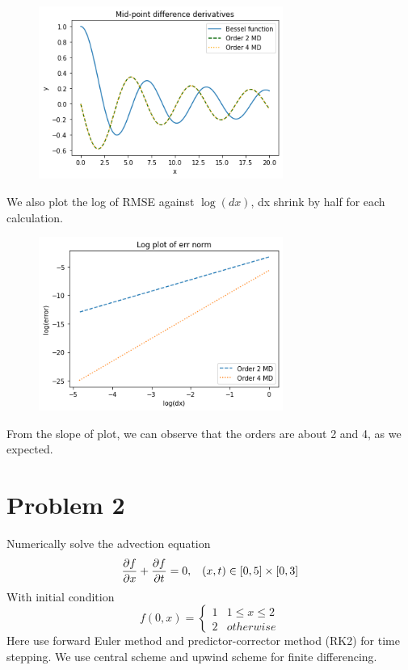 \documentclass{article}
\begin{document}
\begin{figure}[H]
    \centering
    \includegraphics[width = 8cm]{pictures/pic4.png}
\end{figure}

We also plot the log of RMSE against $\log(dx)$, dx shrink by half for each calculation.

\begin{figure}[H]
    \centering
    \includegraphics[width = 8cm]{pictures/pic5.png}
\end{figure}

From the slope of plot, we can observe that the orders are about 2 and 4, as we expected.

\section{Problem 2}
Numerically solve the advection equation
$$\frac{\partial f}{\partial x} + \frac{\partial f}{\partial t} = 0,\hspace{3mm} (x,t)\in[0,5]\times[0,3]$$
With initial condition
$$f(0,x) = \begin{cases}
1 & 1\leqslant x\leqslant 2 \\
2 & otherwise
\end{cases}$$
Here use forward Euler method and predictor-corrector method (RK2) for time stepping. We use central scheme and upwind scheme for finite differencing.
\end{document}
